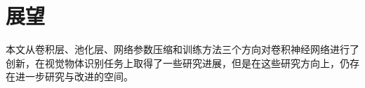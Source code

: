 



\section{展望}

本文从卷积层、池化层、网络参数压缩和训练方法三个方向对卷积神经网络进行了创新，在视觉物体识别任务上取得了一些研究进展，但是在这些研究方向上，仍存在进一步研究与改进的空间。

